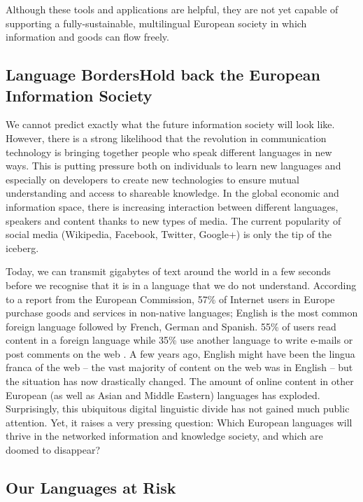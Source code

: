 \begin{multicols}{2}
Although these tools and applications are helpful, they are not yet capable of supporting a fully-sustainable, multilingual European society in which information and goods can flow freely.

\subsection[Language Borders Hold back the European Information Society]{Language Borders\newline Hold back the European Information Society}

We cannot predict exactly what the future information society will look like. However, there is a strong likelihood that the revolution in communication technology is bringing together people who speak different languages in new ways. This is putting pressure both on individuals to learn new languages and especially on developers to create new technologies to ensure mutual understanding and access to shareable knowledge. In the global economic and information space, there is increasing interaction between different languages, speakers and content thanks to new types of media. The current popularity of social media (Wikipedia, Facebook, Twitter, Google+) is only the tip of the iceberg.


Today, we can transmit gigabytes of text around the world in a few seconds before we recognise that it is in a language that we do not understand. According to a report from the European Commission, 57\% of Internet users in Europe purchase goods and services in non-native languages; English is the most common foreign language followed by French, German and Spanish. 55\% of users read content in a foreign language while 35\% use another language to write e-mails or post comments on the web \cite{EC1}. A few years ago, English might have been the lingua franca of the web -- the vast majority of content on the web was in English -- but the situation has now drastically changed. The amount of online content in other European (as well as Asian and Middle Eastern) languages has exploded.
Surprisingly, this ubiquitous digital linguistic divide has not gained much public attention. Yet, it raises a very pressing question: Which European languages will thrive in the networked information and knowledge society, and which are doomed to disappear?

\subsection{Our Languages at Risk}


\end{multicols}
